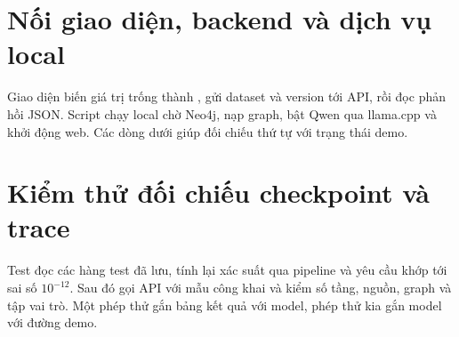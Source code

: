 \ifdefined\projectCodeAppendix
\section{Nối giao diện, backend và dịch vụ local}
Giao diện biến giá trị trống thành , gửi dataset và version tới API, rồi đọc phản hồi JSON. Script chạy local chờ Neo4j, nạp graph, bật Qwen qua llama.cpp và khởi động web. Các dòng dưới giúp đối chiếu thứ tự với trạng thái demo.

\section{Kiểm thử đối chiếu checkpoint và trace}
Test đọc các hàng test đã lưu, tính lại xác suất qua pipeline và yêu cầu khớp tới sai số \(10^{-12}\). Sau đó gọi API với mẫu công khai và kiểm số tầng, nguồn, graph và tập vai trò. Một phép thử gắn bảng kết quả với model, phép thử kia gắn model với đường demo.
\fi
